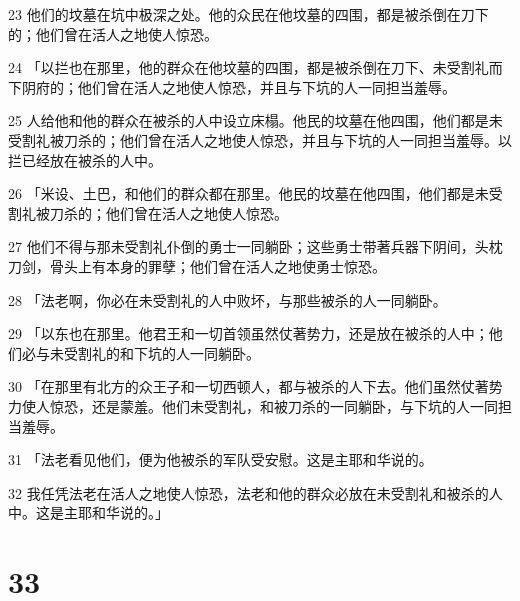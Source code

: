 \par 23 他们的坟墓在坑中极深之处。他的众民在他坟墓的四围，都是被杀倒在刀下的；他们曾在活人之地使人惊恐。
\par 24 「以拦也在那里，他的群众在他坟墓的四围，都是被杀倒在刀下、未受割礼而下阴府的；他们曾在活人之地使人惊恐，并且与下坑的人一同担当羞辱。
\par 25 人给他和他的群众在被杀的人中设立床榻。他民的坟墓在他四围，他们都是未受割礼被刀杀的；他们曾在活人之地使人惊恐，并且与下坑的人一同担当羞辱。以拦已经放在被杀的人中。
\par 26 「米设、土巴，和他们的群众都在那里。他民的坟墓在他四围，他们都是未受割礼被刀杀的；他们曾在活人之地使人惊恐。
\par 27 他们不得与那未受割礼仆倒的勇士一同躺卧；这些勇士带著兵器下阴间，头枕刀剑，骨头上有本身的罪孽；他们曾在活人之地使勇士惊恐。
\par 28 「法老啊，你必在未受割礼的人中败坏，与那些被杀的人一同躺卧。
\par 29 「以东也在那里。他君王和一切首领虽然仗著势力，还是放在被杀的人中；他们必与未受割礼的和下坑的人一同躺卧。
\par 30 「在那里有北方的众王子和一切西顿人，都与被杀的人下去。他们虽然仗著势力使人惊恐，还是蒙羞。他们未受割礼，和被刀杀的一同躺卧，与下坑的人一同担当羞辱。
\par 31 「法老看见他们，便为他被杀的军队受安慰。这是主耶和华说的。
\par 32 我任凭法老在活人之地使人惊恐，法老和他的群众必放在未受割礼和被杀的人中。这是主耶和华说的。」

\chapter{33}

